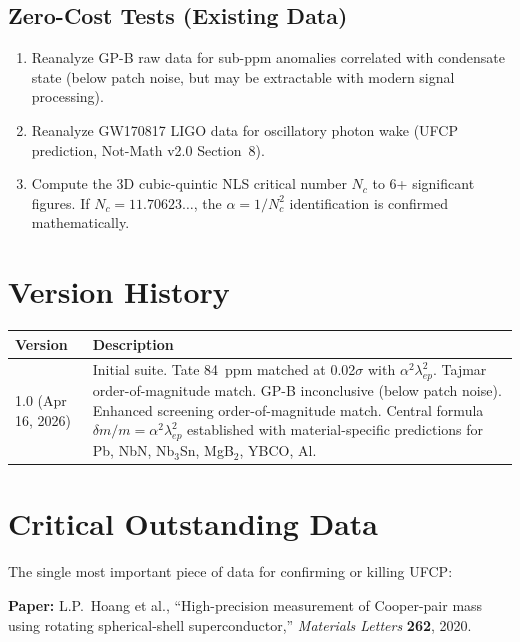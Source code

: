 \documentclass[11pt, a4paper]{article}
\begin{document}
\subsection{Zero-Cost Tests (Existing Data)}

\begin{enumerate}[nosep]
  \item Reanalyze GP-B raw data for sub-ppm anomalies correlated
        with condensate state (below patch noise, but may be
        extractable with modern signal processing).
  \item Reanalyze GW170817 LIGO data for oscillatory photon wake
        (UFCP prediction, Not-Math v2.0 Section~8).
  \item Compute the 3D cubic-quintic NLS critical number $N_c$ to
        6+ significant figures. If $N_c = 11.70623\ldots$, the
        $\alpha = 1/N_c^2$ identification is confirmed mathematically.
\end{enumerate}

\section{Version History}

\begin{center}
\begin{tabular}{@{}lp{10.5cm}@{}}
\toprule
\textbf{Version} & \textbf{Description} \\
\midrule
1.0 (Apr 16, 2026) & Initial suite. Tate 84~ppm matched at
  0.02$\sigma$ with $\alpha^2\lambda_{ep}^2$. Tajmar order-of-magnitude
  match. GP-B inconclusive (below patch noise). Enhanced screening
  order-of-magnitude match. Central formula $\delta m/m =
  \alpha^2\lambda_{ep}^2$ established with material-specific
  predictions for Pb, NbN, Nb$_3$Sn, MgB$_2$, YBCO, Al. \\
\bottomrule
\end{tabular}
\end{center}

\section{Critical Outstanding Data}

The single most important piece of data for confirming or
killing UFCP:

\textbf{Paper:} L.P.~Hoang et al., ``High-precision measurement
of Cooper-pair mass using rotating spherical-shell
superconductor,'' \textit{Materials Letters} \textbf{262}, 2020.
\end{document}
